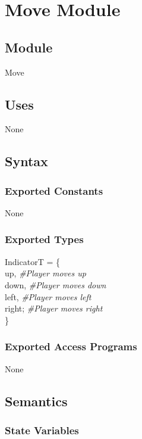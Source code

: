 \documentclass[12pt]{article}
\begin{document}
\newpage
\section* {Move Module}

\subsection*{Module}

Move

\subsection* {Uses}

None

\subsection* {Syntax}

\subsubsection* {Exported Constants}

None

\subsubsection* {Exported Types}

IndicatorT = \{\\
    up, \textit{\#Player moves up}\\
    down, \textit{\#Player moves down}\\
    left, \textit{\#Player moves left}\\
    right; \textit{\#Player moves right}\\
\}

\subsubsection* {Exported Access Programs}

None

\subsection* {Semantics}

\subsubsection* {State Variables}
\end{document}
